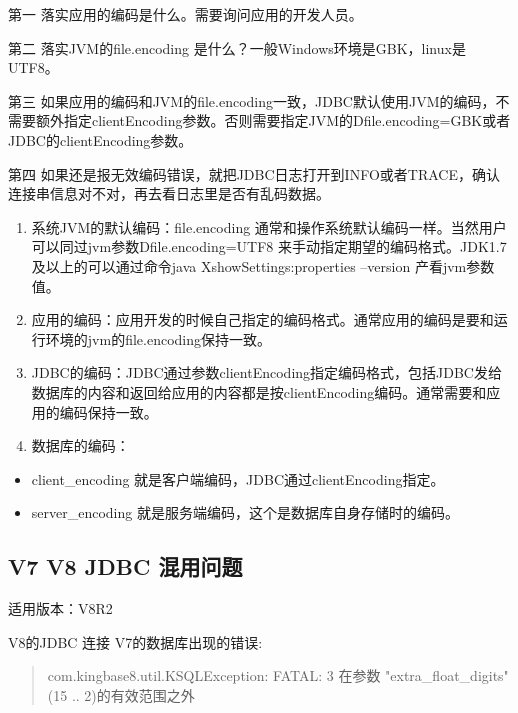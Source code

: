 \documentclass[a4,10pt,oneside,english]{sphinxmanual}
\begin{document}


第一 落实应用的编码是什么。需要询问应用的开发人员。

第二 落实JVM的file.encoding 是什么？一般Windows环境是GBK，linux是UTF8。

第三 如果应用的编码和JVM的file.encoding一致，JDBC默认使用JVM的编码，不需要额外指定clientEncoding参数。否则需要指定JVM的\sphinxhyphen{}Dfile.encoding=GBK或者JDBC的clientEncoding参数。

第四 如果还是报无效编码错误，就把JDBC日志打开到INFO或者TRACE，确认连接串信息对不对，再去看日志里是否有乱码数据。

\begin{enumerate}
%
\item {} 
系统JVM的默认编码：file.encoding 通常和操作系统默认编码一样。当然用户可以同过jvm参数\sphinxhyphen{}Dfile.encoding=UTF8 来手动指定期望的编码格式。JDK1.7及以上的可以通过命令java \sphinxhyphen{}XshowSettings:properties –version 产看jvm参数值。

\item {} 
应用的编码：应用开发的时候自己指定的编码格式。通常应用的编码是要和运行环境的jvm的file.encoding保持一致。

\item {} 
JDBC的编码：JDBC通过参数clientEncoding指定编码格式，包括JDBC发给数据库的内容和返回给应用的内容都是按clientEncoding编码。通常需要和应用的编码保持一致。

\item {} 
数据库的编码：

\end{enumerate}
\begin{itemize}
\item {} 
client\_encoding 就是客户端编码，JDBC通过clientEncoding指定。

\item {} 
server\_encoding 就是服务端编码，这个是数据库自身存储时的编码。

\end{itemize}


\subsection{V7 V8 JDBC 混用问题}
\label{\detokenize{interface/jdbc:v7-v8-jdbc}}
适用版本：V8R2

V8的JDBC 连接 V7的数据库出现的错误:
\begin{quote}

com.kingbase8.util.KSQLException: FATAL: 3 在参数 "extra\_float\_digits" (\sphinxhyphen{}15 .. 2)的有效范围之外
\end{quote}
\end{document}
